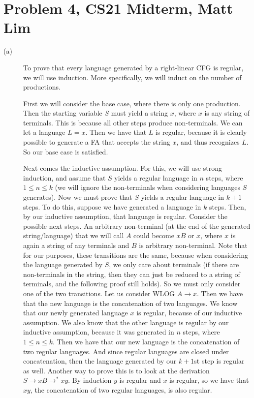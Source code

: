 \documentclass{article}
\begin{document}
\section*{Problem 4, CS21 Midterm, Matt Lim}
\begin{description}
    \item[(a)] To prove that every language generated by a right-linear
        CFG is regular, we will use induction. More specifically, we will
        induct on the number of productions.

        First we will consider the base case, where there is only one
        production. Then the starting variable $S$ must yield a
        string $x$, where $x$ is any string of terminals. This is because
        all other steps produce non-terminals. We can let a language
        $L = x$. Then we have that $L$ is regular, because it is clearly
        possible to generate a FA that accepts the string $x$, and thus
        recognizes $L$. So our base case is satisfied.

        Next comes the inductive assumption. For this, we will use strong
        induction, and assume that $S$ yields a regular language in $n$
        steps, where $1 \leq n \leq k$ (we will ignore the non-terminals
        when considering languages $S$ generates). Now we must prove that
        $S$ yields a regular language in $k + 1$ steps. To do this, suppose we
        have generated a language in $k$ steps. Then, by our inductive
        assumption, that language is regular. Consider the possible next steps.
        An arbitrary non-terminal (at the end of the generated string/language)
        that we will call $A$ could become $xB$ or
        $x$, where $x$ is again a string of any terminals and $B$ is arbitrary
        non-terminal. Note that for our purposes, these transitions are the
        same, because when considering the language generated by $S$, we
        only care about terminals (if there are non-terminals in the string,
        then they can just be reduced to a string of terminals, and the
        following proof still holds). So we must only consider one of the two
        transitions. Let us consider WLOG $A \rightarrow x$. Then we have
        that the new language is the concatenation of two languages.
        We know that our newly generated language $x$ is regular, because of our
        inductive assumption. We also know that the other language is
        regular by our inductive
        assumption, because it was generated in $n$ steps,
        where $1 \leq n \leq k$. Then we have that our new language is
        the concatenation of two regular languages. And since regular
        languages are closed under concatenation, then the language generated
        by our $k + 1$st step is regular as well. Another way to prove this
        is to look at the derivation $S \rightarrow xB \rightarrow^{*}
        xy$. By induction $y$ is regular and $x$ is regular,
        so we have that $xy$, the concatenation of two regular languages, is
        also regular.


\end{description}
\end{document}
